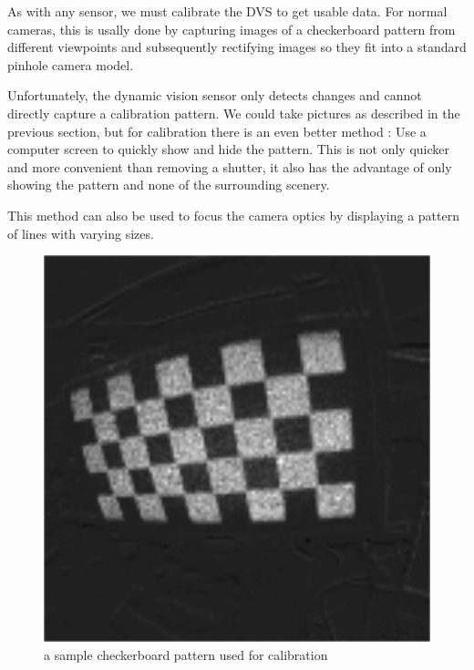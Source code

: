 As with any sensor, we must calibrate the DVS to get usable data. For normal
cameras, this is usally done by capturing images of a checkerboard pattern from
different viewpoints and subsequently rectifying images so they fit into a
standard pinhole camera model.

Unfortunately, the dynamic vision sensor only detects changes and cannot
directly capture a calibration pattern. We could take pictures as described in
the previous section, but for calibration there is an even better method \cite{mueggler2014event}: Use a
computer screen to quickly show and hide the pattern. This is not only quicker
and more convenient than removing a shutter, it also has the advantage of only
showing the pattern and none of the surrounding scenery.

This method can also be used to focus the camera optics by displaying a pattern
of lines with varying sizes.

\begin{figure}
\includegraphics[width=\linewidth]{images/checkerboard_integrated.png}
\caption{a sample checkerboard pattern used for calibration}
\label{fig:calibration}
\end{figure}
